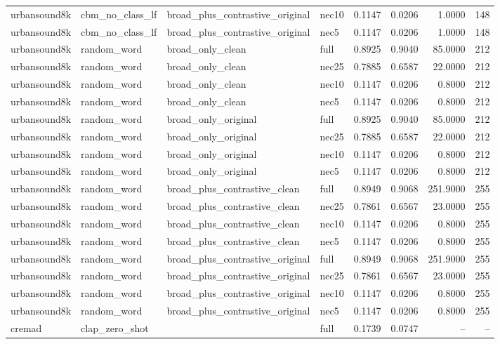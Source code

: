 \begin{table}[t]
\begin{tabular}{llllrrrr}
urbansound8k & cbm\_no\_class\_lf & broad\_plus\_contrastive\_original & nec10 & 0.1147 & 0.0206 & 1.0000 & 148 \\
urbansound8k & cbm\_no\_class\_lf & broad\_plus\_contrastive\_original & nec5 & 0.1147 & 0.0206 & 1.0000 & 148 \\
urbansound8k & random\_word & broad\_only\_clean & full & 0.8925 & 0.9040 & 85.0000 & 212 \\
urbansound8k & random\_word & broad\_only\_clean & nec25 & 0.7885 & 0.6587 & 22.0000 & 212 \\
urbansound8k & random\_word & broad\_only\_clean & nec10 & 0.1147 & 0.0206 & 0.8000 & 212 \\
urbansound8k & random\_word & broad\_only\_clean & nec5 & 0.1147 & 0.0206 & 0.8000 & 212 \\
urbansound8k & random\_word & broad\_only\_original & full & 0.8925 & 0.9040 & 85.0000 & 212 \\
urbansound8k & random\_word & broad\_only\_original & nec25 & 0.7885 & 0.6587 & 22.0000 & 212 \\
urbansound8k & random\_word & broad\_only\_original & nec10 & 0.1147 & 0.0206 & 0.8000 & 212 \\
urbansound8k & random\_word & broad\_only\_original & nec5 & 0.1147 & 0.0206 & 0.8000 & 212 \\
urbansound8k & random\_word & broad\_plus\_contrastive\_clean & full & 0.8949 & 0.9068 & 251.9000 & 255 \\
urbansound8k & random\_word & broad\_plus\_contrastive\_clean & nec25 & 0.7861 & 0.6567 & 23.0000 & 255 \\
urbansound8k & random\_word & broad\_plus\_contrastive\_clean & nec10 & 0.1147 & 0.0206 & 0.8000 & 255 \\
urbansound8k & random\_word & broad\_plus\_contrastive\_clean & nec5 & 0.1147 & 0.0206 & 0.8000 & 255 \\
urbansound8k & random\_word & broad\_plus\_contrastive\_original & full & 0.8949 & 0.9068 & 251.9000 & 255 \\
urbansound8k & random\_word & broad\_plus\_contrastive\_original & nec25 & 0.7861 & 0.6567 & 23.0000 & 255 \\
urbansound8k & random\_word & broad\_plus\_contrastive\_original & nec10 & 0.1147 & 0.0206 & 0.8000 & 255 \\
urbansound8k & random\_word & broad\_plus\_contrastive\_original & nec5 & 0.1147 & 0.0206 & 0.8000 & 255 \\
cremad & clap\_zero\_shot &  & full & 0.1739 & 0.0747 & -- & -- \\

\end{tabular}
\end{table}
